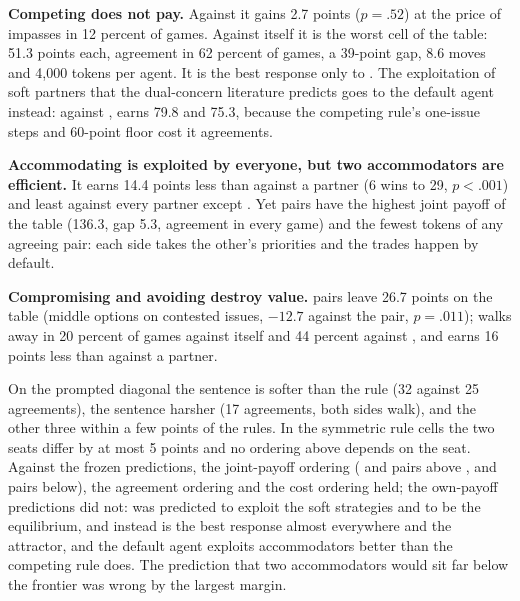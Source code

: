 \textbf{Competing does not pay.} Against \neutral{} it gains 2.7 points ($p = .52$) at the price of impasses in 12 percent of games. Against itself it is the worst cell of the table: 51.3 points each, agreement in 62 percent of games, a 39-point gap, 8.6 moves and 4{,}000 tokens per agent. It is the best response only to \compromising. The exploitation of soft partners that the dual-concern literature predicts goes to the default agent instead: against \accommodating, \neutral{} earns 79.8 and \competing{} 75.3, because the competing rule's one-issue steps and 60-point floor cost it agreements.

\textbf{Accommodating is exploited by everyone, but two accommodators are efficient.} It earns 14.4 points less than \neutral{} against a \neutral{} partner (6 wins to 29, $p < .001$) and least against every partner except \avoiding. Yet \accommodating{} pairs have the highest joint payoff of the table (136.3, gap 5.3, agreement in every game) and the fewest tokens of any agreeing pair: each side takes the other's priorities and the trades happen by default.

\textbf{Compromising and avoiding destroy value.} \compromising{} pairs leave 26.7 points on the table (middle options on contested issues, $-12.7$ against the \neutral{} pair, $p = .011$); \avoiding{} walks away in 20 percent of games against itself and 44 percent against \competing, and earns 16 points less than \neutral{} against a \neutral{} partner.

On the prompted diagonal the \competing{} sentence is softer than the rule (32 against 25 agreements), the \avoiding{} sentence harsher (17 agreements, both sides walk), and the other three within a few points of the rules. In the symmetric rule cells the two seats differ by at most 5 points and no ordering above depends on the seat. Against the frozen predictions, the joint-payoff ordering (\collaborating{} and \accommodating{} pairs above \neutral, \competing{} and \avoiding{} pairs below), the agreement ordering and the cost ordering held; the own-payoff predictions did not: \competing{} was predicted to exploit the soft strategies and to be the equilibrium, and instead \collaborating{} is the best response almost everywhere and the attractor, and the default agent exploits accommodators better than the competing rule does. The prediction that two accommodators would sit far below the frontier was wrong by the largest margin.

